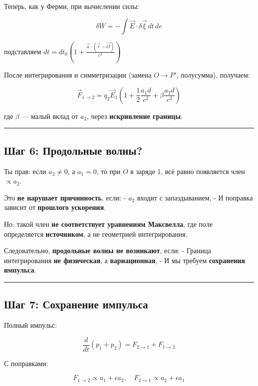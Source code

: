 \documentclass[11pt]{article}
\begin{document}
Теперь, как у Ферми, при вычислении силы:

\[
\delta W = - \int \vec{E} \cdot \delta \vec{\xi} \, dt \, de
\]

подставляем
\(dt = dt_0 (1 + \frac{\vec{a} \cdot (\vec{r} - \vec{O})}{c^2})\)

После интегрирования и симметризации (замена \(O \to P'\), полусумма),
получаем:

\[
\vec{F}_{1 \to 2} = q_2 \vec{E}_1 \left( 1 + \frac{1}{2} \frac{a_1 d}{c^2} + \beta \frac{a_2 d}{c^2} \right)
\]

где \(\beta\) --- малый вклад от \(a_2\), через \textbf{искривление
границы}.

\begin{center}\rule{0.5\linewidth}{\linethickness}\end{center}

\subsection{ Шаг 6: Продольные волны?}

Ты прав: если \(a_2 \ne 0\), а \(a_1 = 0\), то при \(O\) в заряде 1, всё
равно появляется член \(\propto a_2\).

 Это \textbf{не нарушает причинность}, если: - \(a_2\) входит с
запаздыванием, - И поправка зависит от \textbf{прошлого ускорения}.

Но: такой член \textbf{не соответствует уравнениям Максвелла}, где поле
определяется \textbf{источником}, а не геометрией интегрирования.

 Следовательно, \textbf{продольные волны не возникают}, если: - Граница
интегрирования \textbf{не физическая}, а \textbf{вариационная}, - И мы
требуем \textbf{сохранения импульса}.

\begin{center}\rule{0.5\linewidth}{\linethickness}\end{center}

\subsection{Шаг 7: Сохранение импульса}

Полный импульс:

\[
\frac{d}{dt} (p_1 + p_2) = F_{2 \to 1} + F_{1 \to 2}
\]

С поправками:

\[
F_{1 \to 2} \propto a_1 + \epsilon a_2, \quad F_{2 \to 1} \propto a_2 + \epsilon a_1
\]
\end{document}
